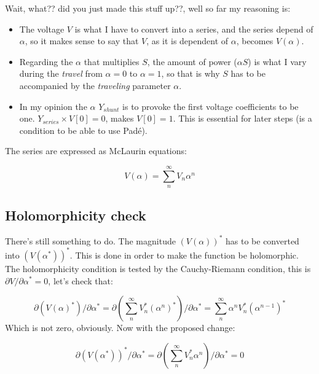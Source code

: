 \documentclass[nols,a4paper,twoside,notoc,fleqn]{tufte-book}
\begin{document}
Wait, what?? did you just made this stuff up??, well so far my reasoning is:
\begin{itemize}
	\item The voltage ${V}$ is what I have to convert into a series, and the series depend of $\alpha$, so it makes sense to say that ${V}$, as it is dependent of $\alpha$, becomes ${V}(\alpha)$.
	
	\item Regarding the $\alpha$ that multiplies ${S}$, the amount of power ($\alpha {S}$) is what I vary during the \textit{travel} from $\alpha=0$ to $\alpha=1$, so that is why ${S}$ has to be accompanied by the \textit{traveling} parameter $\alpha.$
	
	\item In my opinion the $\alpha$ ${Y}_{shunt}$ is to provoke the first voltage coefficients to be one.  ${Y}_{series} \times {V}[0] = 0$, makes $V[0]=1$. This is essential for later steps (is a condition to be able to use Pad\'e). \newline
\end{itemize}

The series are expressed as McLaurin equations:

\begin{equation}
V(\alpha) = \sum_{n}^{\infty} V_n \alpha ^n
\label{eq:McLaurinV}
\end{equation}

\subsection{Holomorphicity check}
	
	There's still something to do. The magnitude $\left({V}( \alpha )\right)^*$ has to be converted into $\left({V}( \alpha^* )\right)^*$. This is done in order to make the function be holomorphic. The holomorphicity condition is tested by the Cauchy-Riemann condition, this is $\partial {V} / \partial \alpha^* = 0$, let's check that:
	
	\begin{equation}
	\partial \left({V}( \alpha )^*\right) / \partial \alpha^*  = \partial \left(\sum_{n}^{\infty} V_n^* (\alpha ^n)^*\right) / \partial \alpha^*  = \sum_{n}^{\infty} \alpha ^n V_n^* (\alpha ^{n-1})^*
	\end{equation} 
	Which is not zero, obviously. Now with the proposed change:
	
	\begin{equation}
	\partial \left( {V}( \alpha^* )\right)^* / \partial \alpha^*  = \partial \left(\sum_{n}^{\infty} {V}_n^* \alpha ^n \right) / \partial \alpha^*  = 0
	\end{equation} 
	
\end{document}
